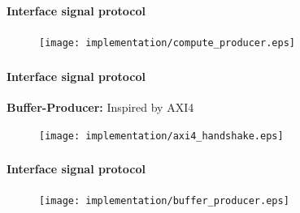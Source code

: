 

\begin{frame}[fragile]
\frametitle{\ImplementationTitle}
\framesubtitle{Interface signal protocol}
\begin{figure}
        \centering
        \texttt{[image: implementation/compute\_producer.eps]}
\end{figure}

\end{frame}




\begin{frame}[fragile]
    \frametitle{\ImplementationTitle}
    \framesubtitle{Interface signal protocol}
    \textbf{Buffer-Producer:} Inspired by AXI4\\
    \begin{figure}
                \texttt{[image: implementation/axi4\_handshake.eps]}

        \end{figure}
\end{frame}


\begin{frame}[fragile]
    \frametitle{\ImplementationTitle}
    \framesubtitle{Interface signal protocol}
        \begin{figure}
                \centering
                \texttt{[image: implementation/buffer\_producer.eps]}
       \end{figure}
\end{frame}




